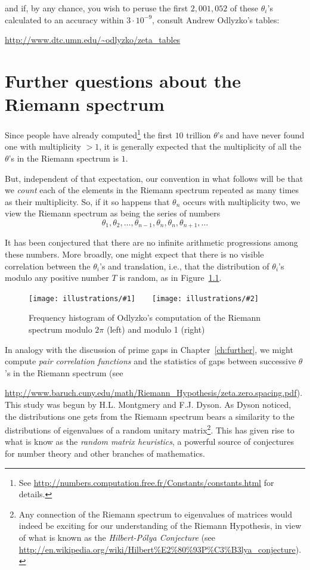 \documentclass[openany]{book}
\newcommand{\illtwo}[4]{%
   \begin{figure}[H]\centering%
   \texttt{[image: illustrations/\#1]}$\qquad$\texttt{[image: illustrations/\#2]}%
   \caption{#4}%
    \end{figure}}
\theoremstyle{plain}
\theoremstyle{definition}
\begin{document}
{\vskip20pt



\noindent{}and if, by any chance, you wish to peruse the first
$2{,}001{,}052$
 of these $\theta_i$'s calculated to an accuracy
within $3\cdot 10^{-9}$, consult Andrew Odlyzko's tables:
\begin{center}
\url{http://www.dtc.umn.edu/~odlyzko/zeta_tables}
\end{center}



\chapter{ Further questions about the Riemann spectrum}

Since people have already computed\footnote{See \url{http://numbers.computation.free.fr/Constants/constants.html} for details.}
the first $10$ trillion $\theta$'s
and have never found one with
multiplicity $>1$, it is generally expected that the multiplicity of all
the $\theta$'s in the Riemann spectrum is $1$.

  But, independent of
that expectation, our convention in what follows will be that we {\it
  count} each of the elements in the Riemann spectrum repeated as many
times as their multiplicity. So, if it so happens that $\theta_n$
occurs with multiplicity two, we view the Riemann spectrum as being
the series of numbers
  $$\theta_1, \theta_2, \dots, \theta_{n-1}, \theta_n, \theta_n, \theta_{n+1}, \dots$$

It has been conjectured that there are no infinite arithmetic progressions among these numbers.  More broadly, one might expect that there is no visible  correlation between the $\theta_i$'s and translation, i.e., that the distribution of $\theta_i$'s modulo any positive number $T$ is random, as in Figure~\ref{fig:zero-spacing}.



\illtwo{zero-spacing-mod2pi}{zero-spacing-mod1}{0.4}{Frequency histogram of Odlyzko's computation of the Riemann spectrum modulo $2\pi$ (left) and modulo 1 (right)\label{fig:zero-spacing}}

        In analogy with the discussion of prime gaps in Chapter~\ref{ch:further}, we might compute {\it pair correlation functions} and the statistics of gaps between successive $\theta$'s in the Riemann spectrum (see {\url{http://www.baruch.cuny.edu/math/Riemann_Hypothesis/zeta.zero.spacing.pdf}). This study was  begun by H.L. Montgmery and F.J. Dyson. As  Dyson noticed, the distributions one gets from the Riemann spectrum bears a similarity to the distributions of eigenvalues of a random unitary matrix{\footnote{ Any connection of the Riemann spectrum to eigenvalues of matrices would indeed be exciting for our understanding of the Riemann Hypothesis, in view of what is known as the {\it Hilbert-P{\'o}lya Conjecture}  (see {\url{http://en.wikipedia.org/wiki/Hilbert\%E2\%80\%93P\%C3\%B3lya_conjecture}}).}}. This has given rise to what is know as the {\it random matrix heuristics},  a powerful source of conjectures for number theory and other branches of mathematics.

}}
\end{document}
